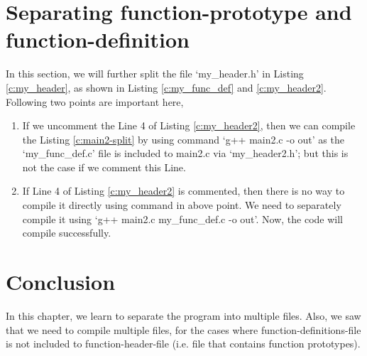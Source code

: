 \section{Separating function-prototype and function-definition}
In this section, we will further split the file `my\_header.h' in Listing \ref{c:my_header}, as shown in Listing \ref{c:my_func_def} and \ref{c:my_header2}. Following two points are important here, 
\begin{enumerate}
	\item If we uncomment the Line 4 of Listing \ref{c:my_header2}, then we can compile the Listing \ref{c:main2-split} by using command `g++ main2.c -o out' as the `my\_func\_def.c' file is included to main2.c via `my\_header2.h'; but this is not the case if we comment this Line. 
	\item If Line 4 of Listing \ref{c:my_header2} is commented, then there is no way to compile it directly using command in above point. We need to separately compile it using `g++ main2.c my\_func\_def.c -o out'. Now, the code will compile successfully. 
\end{enumerate}







\section{Conclusion}
In this chapter, we learn to separate the program into multiple files. Also, we saw that we need to compile multiple files, for the cases where function-definitions-file is not included to function-header-file (i.e. file that contains function prototypes). 
